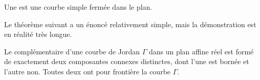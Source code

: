 \begin{definition}
    Une  est une courbe simple fermée dans le plan.
\end{definition}

Le théorème suivant a un énoncé relativement simple, mais la démonstration est en réalité très longue.
\begin{theorem}
     Le complémentaire d'une courbe de Jordan \( \Gamma\) dans un plan affine réel est formé de exactement deux composantes connexes distinctes, dont l'une est bornée et l'autre non. Toutes deux ont pour frontière la courbe \( \Gamma\).
\end{theorem}

